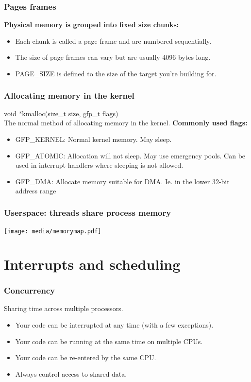 \documentclass{beamer}
\begin{document}
\begin{frame}
\frametitle{Pages frames}
\textbf{Physical memory is grouped into fixed size chunks:}
\begin{itemize}
	\item Each chunk is called a page frame and are numbered sequentially.
	\item The size of page frames can vary but are usually 4096 bytes long.
	\item PAGE\_SIZE is defined to the size of the target you’re building for.
\end{itemize}
\end{frame}

\begin{frame}
\frametitle{Allocating memory in the kernel}
void *kmalloc(size\_t size, gfp\_t flags) \\
The normal method of allocating memory in the kernel.
\textbf{Commonly used flags:}
\begin{itemize}
	\item GFP\_KERNEL: Normal kernel memory. May sleep.
	\item GFP\_ATOMIC: Allocation will not sleep. May use emergency pools. Can be used in interrupt handlers where sleeping is not allowed.
	\item GFP\_DMA: Allocate memory suitable for DMA. Ie. in the lower 32-bit address range
\end{itemize}
\end{frame}

\begin{frame}
\frametitle{Userspace: threads share process memory}
\begin{center}
	\texttt{[image: media/memorymap.pdf]}
\end{center}
\end{frame}


\section{Interrupts and scheduling}

\begin{frame}
\frametitle{Concurrency}
Sharing time across multiple processors.
\begin{itemize}
	\item Your code can be interrupted at any time (with a few exceptions).
	\item Your code can be running at the same time on multiple CPUs.
	\item Your code can be re-entered by the same CPU.
	\item Always control access to shared data.
\end{itemize}
\end{frame}
\end{document}
